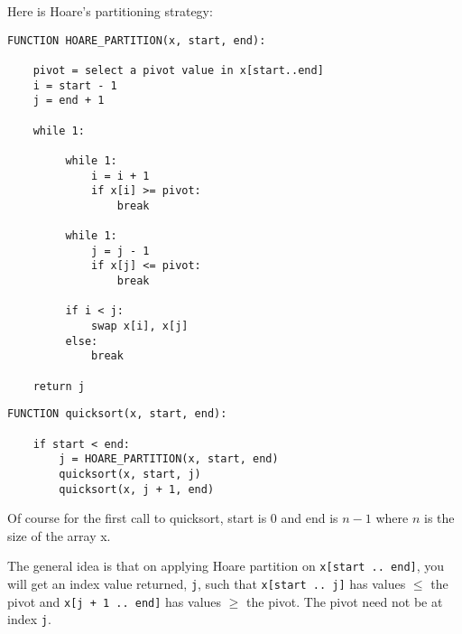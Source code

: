 Here is Hoare's partitioning strategy:

\begin{Verbatim}[frame=single,fontsize=\footnotesize]
FUNCTION HOARE_PARTITION(x, start, end):

    pivot = select a pivot value in x[start..end]
    i = start - 1
    j = end + 1

    while 1:

         while 1:
             i = i + 1
             if x[i] >= pivot:
                 break

         while 1:
             j = j - 1
             if x[j] <= pivot:
                 break

         if i < j:
             swap x[i], x[j]
         else:
             break

    return j
\end{Verbatim}

\begin{Verbatim}[frame=single,fontsize=\footnotesize]
FUNCTION quicksort(x, start, end):

    if start < end:
        j = HOARE_PARTITION(x, start, end)
        quicksort(x, start, j)
        quicksort(x, j + 1, end)
\end{Verbatim}

Of course for the first call to quicksort, start is 0 and end is
$n - 1$ where $n$ is the size of the array x.

The general idea is that on applying Hoare partition on
\verb!x[start .. end]!, you will get an index value returned, \verb!j!,
such that
\verb!x[start .. j]! has values $\leq$ the pivot
and
\verb!x[j + 1 .. end]! has values $\geq$ the pivot.
The pivot need not be at index \verb!j!.

